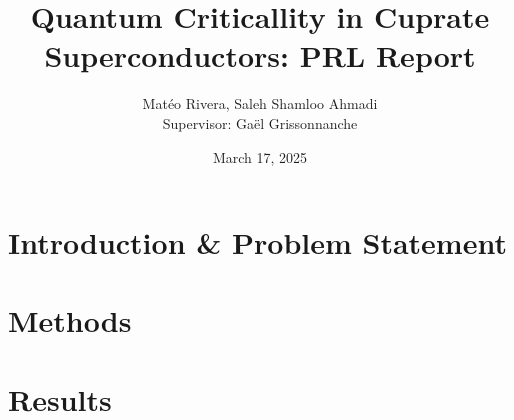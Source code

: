 \documentclass[12pt]{article}
\title{Quantum Criticallity in Cuprate Superconductors: PRL Report}
\author{Matéo Rivera, Saleh Shamloo Ahmadi\\Supervisor: Gaël Grissonnanche}
\date{March 17, 2025}
\begin{document}
\maketitle
\section{Introduction \& Problem Statement}






\section{Methods}




\section{Results}



\end{document}
